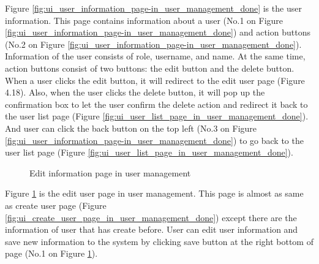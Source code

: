 \documentclass[12pt,oneside,openright,a4paper]{cpe-english-project}
\begin{document}
Figure \ref*{fig:ui_user_information_page-in_user_management_done} is the user information. This page contains information about a user (No.1 on Figure  \ref*{fig:ui_user_information_page-in_user_management_done}) and action buttons (No.2 on Figure  \ref*{fig:ui_user_information_page-in_user_management_done}). Information of the user consists of role, username, and name. At the same time, action buttons consist of two buttons: the edit button and the delete button. When a user clicks the edit button, it will redirect to the edit user page (Figure 4.18). Also, when the user clicks the delete button, it will pop up the confirmation box to let the user confirm the delete action and redirect it back to the user list page (Figure  \ref*{fig:ui_user_list_page_in_user_management_done}). And user can click the back button on the top left (No.3 on Figure  \ref*{fig:ui_user_information_page-in_user_management_done}) to go back to the user list page (Figure  \ref*{fig:ui_user_list_page_in_user_management_done}).

\begin{figure}[!h]\centering
		\caption{Edit information page in user management}\label{fig:ui_edit_information_page_in_user_management_done}
	\end{figure}
Figure \ref*{fig:ui_edit_information_page_in_user_management_done} is the edit user page in user management. This page is almost as same as 
create user page (Figure \ref*{fig:ui_create_user_page_in_user_management_done}) except there are the information of user that has create before. 
User can edit user information and save new information to the system by clicking save 
button at the right bottom of page (No.1 on Figure \ref*{fig:ui_edit_information_page_in_user_management_done}).
\end{document}
